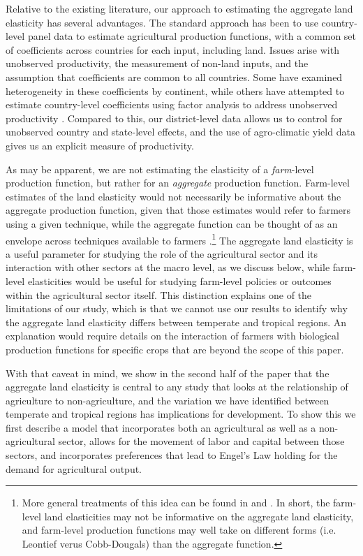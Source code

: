 \documentclass[11pt]{article}
\begin{document}
Relative to the existing literature, our approach to estimating the aggregate land elasticity has several advantages. The standard approach has been to use country-level panel data \citep{Hayami:1970ly,Hayami:1985cr,cpr1997,mm2001,Mundlak:2000dq,mbl2012,et2013mango} to estimate agricultural production functions, with a common set of coefficients across countries for each input, including land. Issues arise with unobserved productivity, the measurement of non-land inputs, and the assumption that coefficients are common to all countries. Some have examined heterogeneity in these coefficients \citep{gg2003,Wiebe2003Resource-Qualit} by continent, while others have attempted to estimate country-level coefficients using factor analysis to address unobserved productivity \citep{et2013mango,ev2016clim}. Compared to this, our district-level data allows us to control for unobserved country and state-level effects, and the use of agro-climatic yield data gives us an explicit measure of productivity.

As may be apparent, we are not estimating the elasticity of a \textit{farm}-level production function, but rather for an \textit{aggregate} production function. Farm-level estimates of the land elasticity would not necessarily be informative about the aggregate production function, given that those estimates would refer to farmers using a given technique, while the aggregate function can be thought of as an envelope across techniques available to farmers \citep{Hayami:1970ly}.\footnote{More general treatments of this idea can be found in \citet{houthakker1955} and \citet{jones2005}. In short, the farm-level land elasticities may not be informative on the aggregate land elasticity, and farm-level production functions may well take on different forms (i.e. Leontief verus Cobb-Dougals) than the aggregate function.} The aggregate land elasticity is a useful parameter for studying the role of the agricultural sector and its interaction with other sectors at the macro level, as we discuss below, while farm-level elasticities would be useful for studying farm-level policies or outcomes within the agricultural sector itself. This distinction explains one of the limitations of our study, which is that we cannot use our results to identify why the aggregate land elasticity differs between temperate and tropical regions. An explanation would require details on the interaction of farmers with biological production functions for specific crops that are beyond the scope of this paper. 

With that caveat in mind, we show in the second half of the paper that the aggregate land elasticity is central to any study that looks at the relationship of agriculture to non-agriculture, and the variation we have identified between temperate and tropical regions has implications for development. To show this we first describe a model that incorporates both an agricultural as well as a non-agricultural sector, allows for the movement of labor and capital between those sectors, and incorporates preferences that lead to Engel's Law holding for the demand for agricultural output. 
\end{document}
